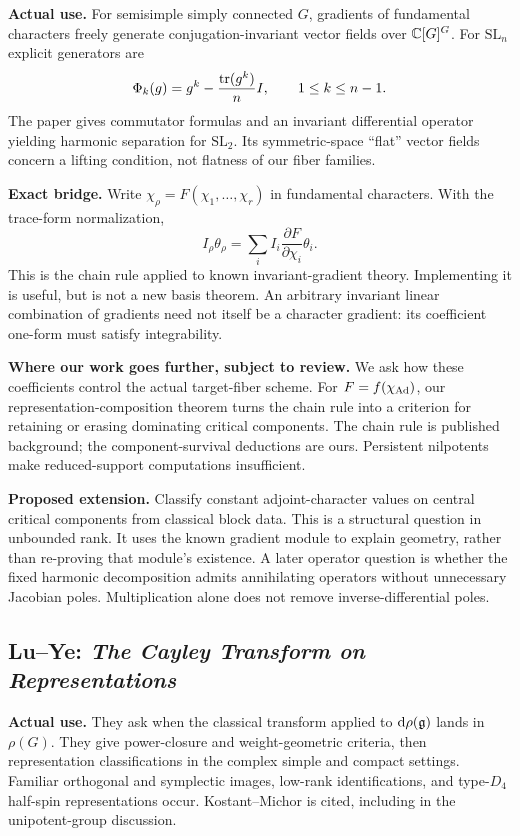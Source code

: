 \textbf{Actual use.} For semisimple simply connected $G$, gradients of fundamental characters freely generate conjugation-invariant vector fields over $\mathbb C[G]^G$. For $\mathrm{SL}_n$ explicit generators are
\[
\Phi_k(g)=g^k-\frac{\operatorname{tr}(g^k)}n I,\qquad 1\le k\le n-1.
\]
The paper gives commutator formulas and an invariant differential operator yielding harmonic separation for $\mathrm{SL}_2$. Its symmetric-space ``flat'' vector fields concern a lifting condition, not flatness of our fiber families.

\textbf{Exact bridge.} Write $\chi_\rho=F(\chi_1,\ldots,\chi_r)$ in fundamental characters. With the trace-form normalization,
\begin{equation}\label{eq:chain}
I_\rho\theta_\rho=\sum_i I_i
\frac{\partial F}{\partial\chi_i}\theta_i.
\end{equation}
This is the chain rule applied to known invariant-gradient theory. Implementing it is useful, but is not a new basis theorem. An arbitrary invariant linear combination of gradients need not itself be a character gradient: its coefficient one-form must satisfy integrability.

\textbf{Where our work goes further, subject to review.} We ask how these coefficients control the actual target-fiber scheme. For $F=f(\chi_{\operatorname{Ad}})$, our representation-composition theorem turns the chain rule into a criterion for retaining or erasing dominating critical components. The chain rule is published background; the component-survival deductions are ours. Persistent nilpotents make reduced-support computations insufficient.

\textbf{Proposed extension.} Classify constant adjoint-character values on central critical components from classical block data. This is a structural question in unbounded rank. It uses the known gradient module to explain geometry, rather than re-proving that module's existence. A later operator question is whether the fixed harmonic decomposition admits annihilating operators without unnecessary Jacobian poles. Multiplication alone does not remove inverse-differential poles.

\subsection{Lu--Ye: \emph{The Cayley Transform on Representations}}

\textbf{Actual use.} They ask when the classical transform applied to $\mathrm d\rho(\mathfrak g)$ lands in $\rho(G)$. They give power-closure and weight-geometric criteria, then representation classifications in the complex simple and compact settings. Familiar orthogonal and symplectic images, low-rank identifications, and type-$D_4$ half-spin representations occur. Kostant--Michor is cited, including in the unipotent-group discussion.

